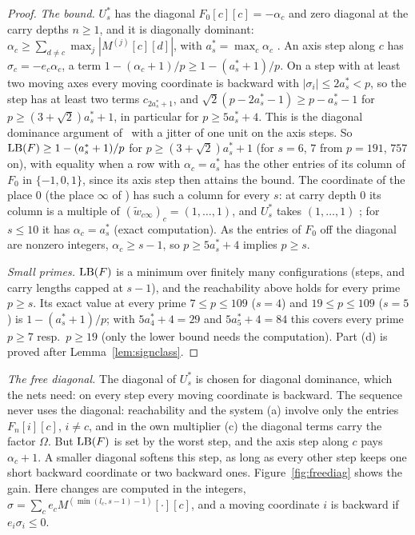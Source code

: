 \begin{proof}
\emph{The bound.} $U^*_s$ has the diagonal $F_0[c][c]=-\alpha_c$ and zero diagonal at the carry depths $n\ge1$, and it is diagonally dominant: $\alpha_c\ge\sum_{d\ne c}\max_j|M^{(j)}[c][d]|$, with $a^*_s=\max_c\alpha_c$ \cite{Gru26geo}%
. An axis step along $c$ has $\sigma_c=-e_c\alpha_c$, a term $1-(\alpha_c+1)/p\ge1-(a^*_s+1)/p$. On a step with at least two moving axes every moving coordinate is backward with $|\sigma_i|\le2a^*_s<p$, so the step has at least two terms $c_{2a^*_s+1}$, and $\sqrt2(p-2a^*_s-1)\ge p-a^*_s-1$ for $p\ge(3+\sqrt2)a^*_s+1$, in particular for $p\ge5a^*_s+4$. This is the diagonal dominance argument of \cite{Gru26geo}%
\ with a jitter of one unit on the axis steps. So $\mathrm{LB}(F)\ge1-(a^*_s+1)/p$ for $p\ge(3+\sqrt2)a^*_s+1$ (for $s=6$, $7$ from $p=191$, $757$ on), with equality when a row with $\alpha_c=a^*_s$ has the other entries of its column of $F_0$ in $\{-1,0,1\}$, since its axis step then attains the bound. The coordinate of the place $0$ (the place $\infty$ of \cite{Gru26geo}) has such a column for every $s$: at carry depth $0$ its column is a multiple of $(\tilde w_{c\infty})_c=(1,\dots,1)$, and $U^*_s$ takes $(1,\dots,1)$%
; for $s\le10$ it has $\alpha_c=a^*_s$ (exact computation). As the entries of $F_0$ off the diagonal are nonzero integers, $\alpha_c\ge s-1$, so $p\ge5a^*_s+4$ implies $p\ge s$.

\emph{Small primes.} $\mathrm{LB}(F)$ is a minimum over finitely many configurations (steps, and carry lengths capped at $s-1$), and the reachability above holds for every prime $p\ge s$. Its exact value at every prime $7\le p\le109$ ($s=4$) and $19\le p\le109$ ($s=5$) is $1-(a^*_s+1)/p$; with $5a^*_4+4=29$ and $5a^*_5+4=84$ this covers every prime $p\ge7$ resp.\ $p\ge19$ (only the lower bound needs the computation). Part (d) is proved after Lemma~\ref{lem:signclass}.
\end{proof}

\emph{The free diagonal.} The diagonal of $U^*_s$ is chosen for diagonal dominance, which the nets need: on every step every moving coordinate is backward. The sequence never uses the diagonal: reachability and the system (a) involve only the entries $F_n[i][c]$, $i\ne c$, and in the own multiplier (c) the diagonal terms carry the factor $\Omega$. But $\mathrm{LB}(F)$ is set by the worst step, and the axis step along $c$ pays $\alpha_c+1$. A smaller diagonal softens this step, as long as every other step keeps one short backward coordinate or two backward ones. Figure~\ref{fig:freediag} shows the gain. Here changes are computed in the integers, $\sigma=\sum_ce_cM^{(\min(l_c,s-1)-1)}[\cdot][c]$, and a moving coordinate $i$ is backward if $e_i\sigma_i\le0$.

